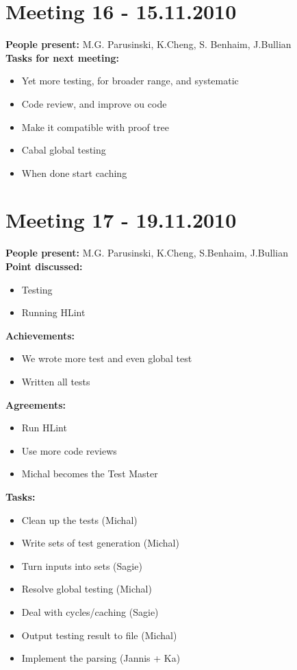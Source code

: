 \documentclass[12pt,a4paper]{article}
\begin{document}
\section*{Meeting 16 - 15.11.2010}
\textbf{People present:} M.G. Parusinski, K.Cheng, S. Benhaim,  J.Bullian\\ 
\textbf{Tasks for next meeting:}
\begin{itemize}
\item Yet more testing, for broader range, and systematic
\item Code review, and improve ou code
\item Make it compatible with proof tree
\item Cabal global testing
\item When done start caching
\end{itemize}

\section*{Meeting 17 - 19.11.2010}
\textbf{People present:} M.G. Parusinski, K.Cheng, S.Benhaim, J.Bullian \\ 
\textbf{Point discussed:} 
\begin{itemize}
\item Testing
\item Running HLint
\end{itemize}
\textbf{Achievements:}
\begin{itemize}
\item We wrote more test and even global test
\item Written all tests
\end{itemize}
\textbf{Agreements:}
\begin{itemize}
\item Run HLint
\item Use more code reviews
\item Michal becomes the Test Master
\end{itemize}
\textbf{Tasks:}
\begin{itemize}
\item Clean up the tests (Michal) 
\item Write sets of test generation (Michal)
\item Turn inputs into sets (Sagie)
\item Resolve global testing (Michal)
\item Deal with cycles/caching (Sagie)
\item Output testing result to file (Michal)
\item Implement the parsing (Jannis + Ka)
\end{itemize}
\end{document}
